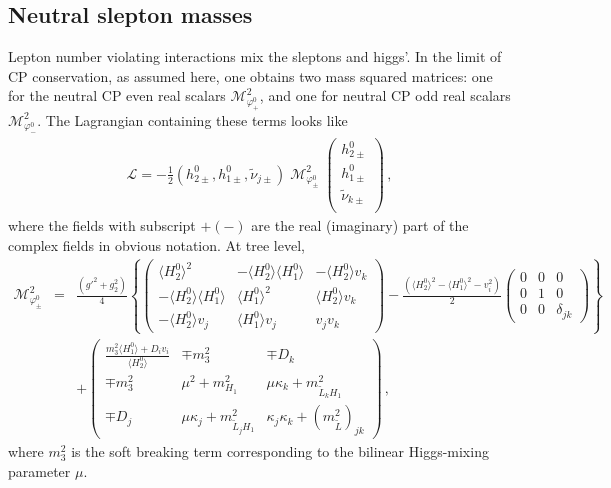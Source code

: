 \documentclass[pdflatex,final,3p,times]{elsarticle}
\begin{document}
\subsection{Neutral slepton masses}
Lepton number violating interactions mix the sleptons and higgs'. In the limit
of CP conservation, as assumed here, one obtains two mass squared matrices:
one for the neutral CP even real scalars ${\mathcal M}^2_{\varphi^0_+}$, and
one for neutral CP 
odd real scalars ${\mathcal M}^2_{\varphi^0_-}$.  
The Lagrangian containing these terms looks like
\begin{eqnarray}\label{eq:mcp}
{\mathcal L}= -\frac{1}{2}(h^0_{2\pm} , h^0_{1\pm}, \tilde{\nu}_{j\pm})
\; {\mathcal M}^2_{\varphi^0_\pm}\; \left ( \begin{array}{c}
 h^0_{2\pm} \\ h^0_{1\pm} \\ \tilde{\nu}_{k\pm} \\
 \end{array}\right)\,,
\end{eqnarray}
where the fields with subscript $+(-)$ are the real (imaginary) part
of the complex fields in obvious notation.  At tree level,
\begin{eqnarray}\label{eq:mcptree}
  {\mathcal M}^2_{\varphi^0_\pm} &=&
  \frac{(g'^2+g_2^2)}{4}\left\{\left( \begin{array}{ccc} \langle H_2^0
      \rangle^2 & -\langle H_2^0 \rangle \langle H_1^0 \rangle &
      -\langle H_2^0 \rangle v_k \\ -\langle H_2^0 \rangle \langle
      H_1^0 \rangle & \langle H_1^0 \rangle^2 & \langle H_2^0 \rangle
      v_k \\ -\langle H_2^0 \rangle v_j & \langle H_1^0 \rangle v_j &
      v_j v_k \end{array} \right)-\frac{\left(\langle H_2^0 \rangle^2
      - \langle H_1^0 \rangle^2 - v_i^2 \right)}{2}
    \left( \begin{array}{ccc} 0 & 0 & 0 \\ 0 & 1 & 0 \\ 0 & 0 &
      \delta_{jk}\end{array} \right)\right\} \nonumber\\ && +
  \left( \begin{array}{ccc} \frac{m_3^2\langle H_1^0 \rangle + D_i
      v_i}{\langle H_2^0 \rangle} & \mp m_3^2 & \mp D_k \\ \mp m_3^2 &
    \mu^2+m^2_{H_1} & \mu \kappa_k + m^2_{\tilde{L}_kH_1}\\ \mp D_j &
    \mu \kappa_j + m^2_{\tilde{L}_jH_1} & \kappa_j\kappa_k +
    (m^2_{\tilde{L}})_{jk}\end{array} \right)\,,
\end{eqnarray}
where $m_3^2$ is the soft breaking term corresponding to the bilinear Higgs-mixing parameter $\mu$.
\end{document}
